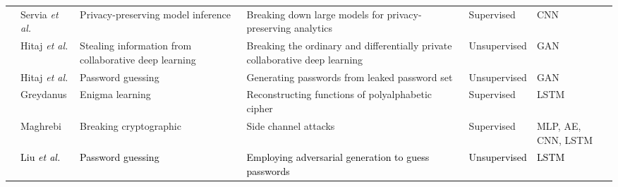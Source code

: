 \documentclass[journal,comsoc,letter]{IEEEtran}
\newcommand{\edit}[1]{\textcolor{black}{#1}}
\begin{document}
\begin{table*}[h!]
\begin{tabular}{|c|C{2.1cm}|C{3.3cm}|C{6cm}|C{1.7cm}|C{1.7cm}|}
                                      & Servia \emph{et al.} \cite{servia2017personal}           & Privacy-preserving model inference                              & Breaking down large models for privacy-preserving analytics                                                                           & Supervised                 & CNN                                                      \\  
                                      & Hitaj \emph{et al.} \cite{hitaj2017deep}                 & Stealing information  from collaborative deep learning          & Breaking the ordinary and differentially private collaborative deep learning                                                          & Unsupervised               & GAN                                                      \\  
                                      & Hitaj \emph{et al.} \cite{abadi2016deep}                 & Password guessing                                               & Generating passwords from leaked password set                                                                                         & Unsupervised               & GAN                                                      \\  
                                      & Greydanus \cite{greydanus2017learning}                   & Enigma learning                                                 & Reconstructing functions of polyalphabetic cipher                                                                                     & Supervised                 & LSTM                                                     \\  
                                      & Maghrebi \cite{maghrebi2016breaking}                     & Breaking cryptographic                                          & Side channel attacks                                                                                                                  & Supervised                 & MLP, AE, CNN, LSTM                                       \\  
                                      & \edit{Liu \emph{et al.} \cite{liu2018genpass}}             & \edit{Password guessing}                                          & \edit{Employing adversarial generation to guess passwords }                                                                                 & \edit{Unsupervised}          & \edit{LSTM}                                                \\  

\end{tabular}
\end{table*}
\end{document}
